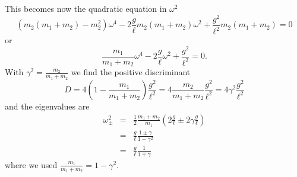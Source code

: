\documentclass[letterpaper,11pt]{article}
\begin{document}
This becomes now the quadratic equation in $\omega^2$
\begin{equation*}
 \left( m_2 (m_1 + m_2) - m_2^2 \right) \omega^4 - 2 \frac{g}{\ell} m_2 (m_1 + m_2) \omega^2 + \frac{g^2}{\ell^2} m_2 (m_1 + m_2) = 0
\end{equation*}
or
\begin{equation*}
 \frac{m_1}{m_1 + m_2} \omega^4 - 2 \frac{g}{\ell} \omega^2  + \frac{g^2}{\ell^2} = 0.
\end{equation*}
With $\gamma^2 = \frac{m_2}{m_1 + m_2}$ we find the positive discriminant
\begin{equation*}
 D = 4 \left(1 - \frac{m_1}{m_1 + m_2}\right) \frac{g^2}{\ell^2} = 4 \frac{m_2}{m_1 + m_2} \frac{g^2}{\ell^2} = 4 \gamma^2 \frac{g^2}{\ell^2}
\end{equation*}
and the eigenvalues are
\begin{eqnarray*}
 \omega_\pm^2 & = & \frac{1}{2} \frac{m_1 + m_2}{m_1} \left( 2 \frac{g}{\ell}  \pm 2 \gamma \frac{g}{\ell} \right) \\
 & = & \frac{g}{\ell} \frac{1 \pm \gamma}{1 - \gamma^2} \\
 & = & \frac{g}{\ell} \frac{1}{1 \mp \gamma}
\end{eqnarray*}
where we used $\frac{m_1}{m_1 + m_2} = 1 - \gamma^2$.
\end{document}
